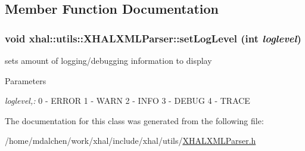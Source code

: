 \subsection{Member Function Documentation}
\hypertarget{classxhal_1_1utils_1_1XHALXMLParser_af021ca1ffe51e9baf956ef7b9e0db8b9}{
\subsubsection[{setLogLevel}]{\setlength{\rightskip}{0pt plus 5cm}void xhal::utils::XHALXMLParser::setLogLevel (int {\em loglevel})}}
\label{classxhal_1_1utils_1_1XHALXMLParser_af021ca1ffe51e9baf956ef7b9e0db8b9}


sets amount of logging/debugging information to display 
\begin{DoxyParams}{Parameters}
\item[{\em loglevel,:}]0 -\/ ERROR 1 -\/ WARN 2 -\/ INFO 3 -\/ DEBUG 4 -\/ TRACE \end{DoxyParams}


The documentation for this class was generated from the following file:\begin{DoxyCompactItemize}
\item 
/home/mdalchen/work/xhal/include/xhal/utils/\hyperlink{XHALXMLParser_8h}{XHALXMLParser.h}\end{DoxyCompactItemize}
